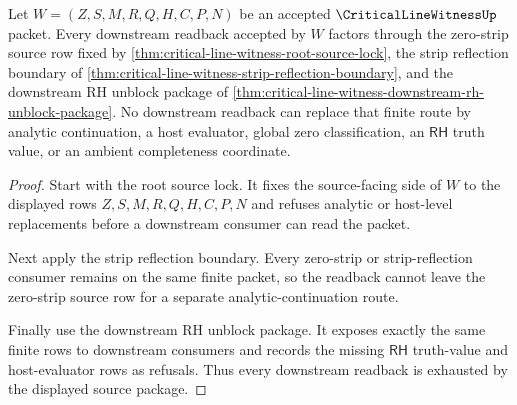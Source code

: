 \begin{theorem}
\label{thm:critical-line-witness-route-readback-exhaustion}
Let $W=(Z,S,M,R,Q,H,C,P,N)$ be an accepted $\CriticalLineWitnessUp$ packet. Every downstream readback accepted by $W$ factors through the zero-strip source row fixed by \autoref{thm:critical-line-witness-root-source-lock}, the strip reflection boundary of \autoref{thm:critical-line-witness-strip-reflection-boundary}, and the downstream RH unblock package of \autoref{thm:critical-line-witness-downstream-rh-unblock-package}. No downstream readback can replace that finite route by analytic continuation, a host evaluator, global zero classification, an $\mathsf{RH}$ truth value, or an ambient completeness coordinate.
\end{theorem}
\begin{proof}
Start with the root source lock. It fixes the source-facing side of $W$ to the displayed rows $Z,S,M,R,Q,H,C,P,N$ and refuses analytic or host-level replacements before a downstream consumer can read the packet.

Next apply the strip reflection boundary. Every zero-strip or strip-reflection consumer remains on the same finite packet, so the readback cannot leave the zero-strip source row for a separate analytic-continuation route.

Finally use the downstream RH unblock package. It exposes exactly the same finite rows to downstream consumers and records the missing $\mathsf{RH}$ truth-value and host-evaluator rows as refusals. Thus every downstream readback is exhausted by the displayed source package.
\end{proof}


